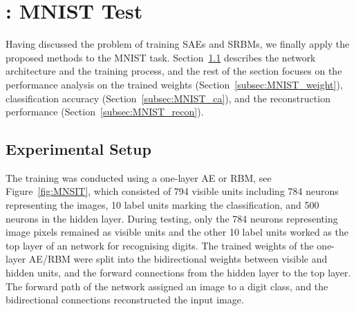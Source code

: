 

\DIFdelbegin %
\DIFdelend \DIFaddbegin \section[Case Study]{\DIFaddend : MNIST Test}
\label{sec:SRM_result}
Having discussed the problem of training SAEs and SRBMs, we finally apply the proposed methods to the MNIST task.
Section~\ref{subsec:MNIST_setup} describes the network architecture and the training process, and the rest of the section focuses on the performance analysis on the trained weights (Section~\ref{subsec:MNIST_weight}), classification accuracy (Section~\ref{subsec:MNIST_ca}), and the reconstruction performance (Section~\ref{subsec:MNIST_recon}).

\subsection{Experimental Setup}
\label{subsec:MNIST_setup}
The training was conducted using a one-layer AE or RBM, see Figure~\ref{fig:MNSIT}, which consisted of 794 visible units including 784 neurons representing the images, 10 label units marking the classification, and 500 neurons in the hidden layer.
During testing, only the 784 neurons representing image pixels remained as visible units and the other 10 label units worked as the top layer of an \DIFdelbegin {}\DIFdelend \DIFaddbegin {}\DIFaddend network for recognising digits.
The trained weights of the one-layer AE/RBM were split into the bidirectional weights between visible and hidden units, and the forward connections from the hidden layer to the top layer.
The forward path of the network assigned an image to a digit class, and the bidirectional connections reconstructed the input image.

